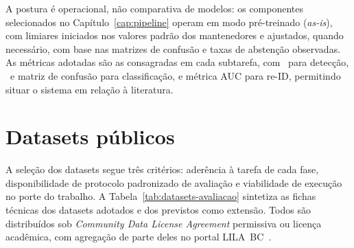 A postura é operacional, não comparativa de modelos: os componentes selecionados no Capítulo~\ref{cap:pipeline} operam em modo pré-treinado (\textit{as-is}), com limiares iniciados nos valores padrão dos mantenedores e ajustados, quando necessário, com base nas matrizes de confusão e taxas de abstenção observadas. As métricas adotadas são as consagradas em cada subtarefa, com \mAP\ para detecção, \Fscore\ e matriz de confusão para classificação,  e métrica AUC para re-ID, permitindo situar o sistema em relação à literatura.

\section{Datasets públicos}
\label{sec:metodologia-datasets}

A seleção dos datasets segue três critérios: aderência à tarefa de cada fase, disponibilidade de protocolo padronizado de avaliação e viabilidade de execução no porte do trabalho. A Tabela~\ref{tab:datasets-avaliacao} sintetiza as fichas técnicas dos datasets adotados e dos previstos como extensão. Todos são distribuídos sob \textit{Community Data License Agreement} permissiva ou licença acadêmica, com agregação de parte deles no portal LILA~BC~\cite{lila_bc}.

